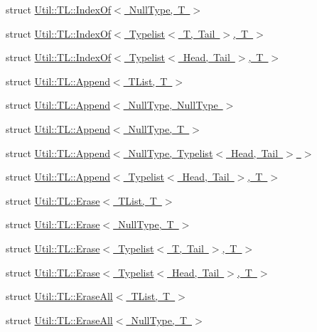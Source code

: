 \begin{DoxyCompactItemize}
struct \mbox{\hyperlink{structUtil_1_1TL_1_1IndexOf_3_01NullType_00_01T_01_4}{Util\+::\+T\+L\+::\+Index\+Of$<$ Null\+Type, T $>$}}
\item 
struct \mbox{\hyperlink{structUtil_1_1TL_1_1IndexOf_3_01Typelist_3_01T_00_01Tail_01_4_00_01T_01_4}{Util\+::\+T\+L\+::\+Index\+Of$<$ Typelist$<$ T, Tail $>$, T $>$}}
\item 
struct \mbox{\hyperlink{structUtil_1_1TL_1_1IndexOf_3_01Typelist_3_01Head_00_01Tail_01_4_00_01T_01_4}{Util\+::\+T\+L\+::\+Index\+Of$<$ Typelist$<$ Head, Tail $>$, T $>$}}
\item 
struct \mbox{\hyperlink{structUtil_1_1TL_1_1Append}{Util\+::\+T\+L\+::\+Append$<$ T\+List, T $>$}}
\item 
struct \mbox{\hyperlink{structUtil_1_1TL_1_1Append_3_01NullType_00_01NullType_01_4}{Util\+::\+T\+L\+::\+Append$<$ Null\+Type, Null\+Type $>$}}
\item 
struct \mbox{\hyperlink{structUtil_1_1TL_1_1Append_3_01NullType_00_01T_01_4}{Util\+::\+T\+L\+::\+Append$<$ Null\+Type, T $>$}}
\item 
struct \mbox{\hyperlink{structUtil_1_1TL_1_1Append_3_01NullType_00_01Typelist_3_01Head_00_01Tail_01_4_01_4}{Util\+::\+T\+L\+::\+Append$<$ Null\+Type, Typelist$<$ Head, Tail $>$ $>$}}
\item 
struct \mbox{\hyperlink{structUtil_1_1TL_1_1Append_3_01Typelist_3_01Head_00_01Tail_01_4_00_01T_01_4}{Util\+::\+T\+L\+::\+Append$<$ Typelist$<$ Head, Tail $>$, T $>$}}
\item 
struct \mbox{\hyperlink{structUtil_1_1TL_1_1Erase}{Util\+::\+T\+L\+::\+Erase$<$ T\+List, T $>$}}
\item 
struct \mbox{\hyperlink{structUtil_1_1TL_1_1Erase_3_01NullType_00_01T_01_4}{Util\+::\+T\+L\+::\+Erase$<$ Null\+Type, T $>$}}
\item 
struct \mbox{\hyperlink{structUtil_1_1TL_1_1Erase_3_01Typelist_3_01T_00_01Tail_01_4_00_01T_01_4}{Util\+::\+T\+L\+::\+Erase$<$ Typelist$<$ T, Tail $>$, T $>$}}
\item 
struct \mbox{\hyperlink{structUtil_1_1TL_1_1Erase_3_01Typelist_3_01Head_00_01Tail_01_4_00_01T_01_4}{Util\+::\+T\+L\+::\+Erase$<$ Typelist$<$ Head, Tail $>$, T $>$}}
\item 
struct \mbox{\hyperlink{structUtil_1_1TL_1_1EraseAll}{Util\+::\+T\+L\+::\+Erase\+All$<$ T\+List, T $>$}}
\item 
struct \mbox{\hyperlink{structUtil_1_1TL_1_1EraseAll_3_01NullType_00_01T_01_4}{Util\+::\+T\+L\+::\+Erase\+All$<$ Null\+Type, T $>$}}
\item 

\end{DoxyCompactItemize}
